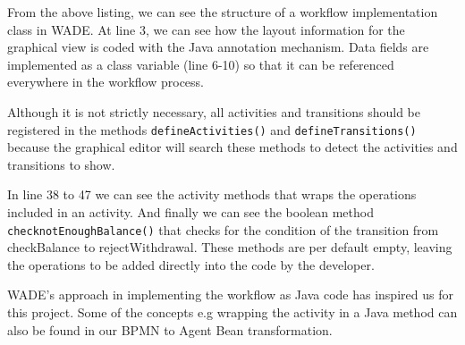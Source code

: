 From the above listing, we can see the structure of a workflow implementation class in WADE. At line 3, we can see how the layout information for the graphical view is coded with the Java annotation mechanism. Data fields are implemented as a class variable (line 6-10) so that it can be referenced everywhere in the workflow process. 

Although it is not strictly necessary, all activities and transitions should be registered in the methods \verb|defineActivities()| and \verb|defineTransitions()| because the graphical editor will search these methods to detect the activities and transitions to show.

In line 38 to 47 we can see the activity methods that wraps the operations included in an activity. And finally we can see the boolean method  \verb|checknotEnoughBalance()| that checks for the condition of the transition from checkBalance to rejectWithdrawal. These methods are per default empty, leaving the operations to be added directly into the code by the developer.

WADE's approach in implementing the workflow as Java code has inspired us for this project. Some of the concepts e.g wrapping the activity in a Java method can also be found in our BPMN to Agent Bean transformation. 